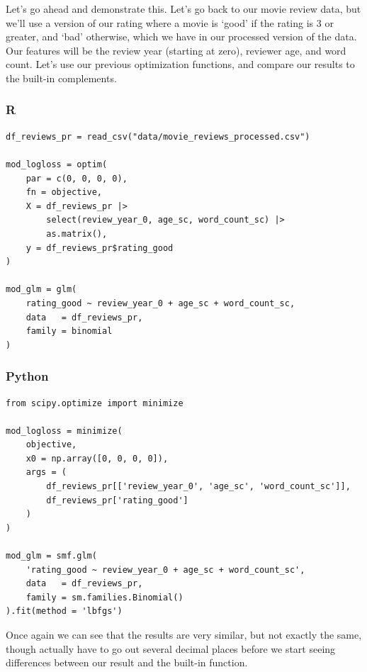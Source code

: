 \documentclass[
  letterpaper,
]{krantz}
\begin{document}
Let's go ahead and demonstrate this. Let's go back to our movie review
data, but we'll use a version of our rating where a movie is `good' if
the rating is 3 or greater, and `bad' otherwise, which we have in our
processed version of the data. Our features will be the review year
(starting at zero), reviewer age, and word count. Let's use our previous
optimization functions, and compare our results to the built-in
complements.

\subsubsection{R}

\begin{verbatim}
df_reviews_pr = read_csv("data/movie_reviews_processed.csv")

mod_logloss = optim(
    par = c(0, 0, 0, 0),
    fn = objective,
    X = df_reviews_pr |>
        select(review_year_0, age_sc, word_count_sc) |>
        as.matrix(),
    y = df_reviews_pr$rating_good
)

mod_glm = glm(
    rating_good ~ review_year_0 + age_sc + word_count_sc,
    data   = df_reviews_pr,
    family = binomial
)
\end{verbatim}

\subsubsection{Python}

\begin{verbatim}
from scipy.optimize import minimize

mod_logloss = minimize(
    objective,
    x0 = np.array([0, 0, 0, 0]),
    args = (
        df_reviews_pr[['review_year_0', 'age_sc', 'word_count_sc']], 
        df_reviews_pr['rating_good']
    )
)

mod_glm = smf.glm(
    'rating_good ~ review_year_0 + age_sc + word_count_sc',
    data   = df_reviews_pr,
    family = sm.families.Binomial()
).fit(method = 'lbfgs')
\end{verbatim}

Once again we can see that the results are very similar, but not exactly
the same, though actually have to go out several decimal places before
we start seeing differences between our result and the built-in
function.
\end{document}
